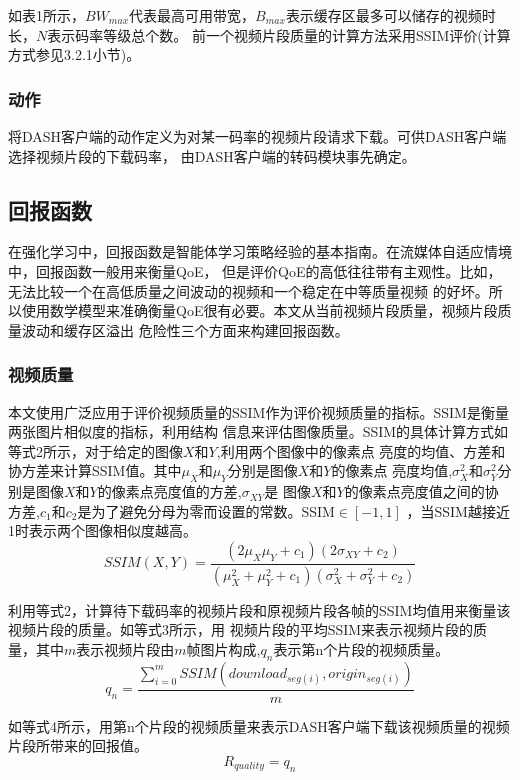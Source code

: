 \documentclass[twocolumn]{article}
\begin{document}
如表1所示，$BW_{max}$代表最高可用带宽，$B_{max}$表示缓存区最多可以储存的视频时长，$N$表示码率等级总个数。
前一个视频片段质量的计算方法采用SSIM评价(计算方式参见3.2.1小节)。
\subsubsection{动作}
将DASH客户端的动作定义为对某一码率的视频片段请求下载。可供DASH客户端选择视频片段的下载码率，
由DASH客户端的转码模块事先确定。
\subsection{回报函数}
在强化学习中，回报函数是智能体学习策略经验的基本指南。在流媒体自适应情境中，回报函数一般用来衡量QoE，
但是评价QoE的高低往往带有主观性。比如，无法比较一个在高低质量之间波动的视频和一个稳定在中等质量视频
的好坏。所以使用数学模型来准确衡量QoE很有必要。本文从当前视频片段质量，视频片段质量波动和缓存区溢出
危险性三个方面来构建回报函数。
\subsubsection{视频质量}
本文使用广泛应用于评价视频质量的SSIM作为评价视频质量的指标\cite{RN15,RN16,RN17}。SSIM是衡量两张图片相似度的指标，利用结构
信息来评估图像质量。SSIM的具体计算方式如等式2所示，对于给定的图像$X$和$Y$,利用两个图像中的像素点
亮度的均值、方差和协方差来计算SSIM值。其中$\mu_{X}$和$\mu_{Y}$分别是图像$X$和$Y$的像素点
亮度均值,$\sigma_{X}^2$和$\sigma_{Y}^2$分别是图像$X$和$Y$的像素点亮度值的方差,$\sigma_{XY}$是
图像$X$和$Y$的像素点亮度值之间的协方差,$c_{1}$和$c_{2}$是为了避免分母为零而设置的常数。SSIM$\in\left[-1,1\right]$
，当SSIM越接近1时表示两个图像相似度越高。
\begin{equation}
SSIM\left(X,Y\right)=\frac{\left(2\mu_{X}\mu_{Y}+c_{1}\right)\left(2\sigma_{XY}+c_{2}\right)}
{\left(\mu_{X}^2+\mu_{Y}^2+c_{1}\right)\left(\sigma_{X}^2+\sigma_{Y}^2+c_{2}\right)}
\end{equation}

利用等式2，计算待下载码率的视频片段和原视频片段各帧的SSIM均值用来衡量该视频片段的质量。如等式3所示，用
视频片段的平均SSIM来表示视频片段的质量，其中$m$表示视频片段由$m$帧图片构成,$q_{n}$表示第n个片段的视频质量。
\begin{equation}
q_{n}=\frac{\sum_{i=0}^m SSIM(download_{seg(i)},origin_{seg(i)})}{m}
\end{equation}

如等式4所示，用第n个片段的视频质量来表示DASH客户端下载该视频质量的视频片段所带来的回报值。
\begin{equation}
R_{quality}=q_{n}
\end{equation}
\end{document}
